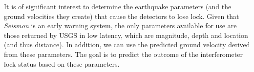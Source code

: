 \documentclass[reprint, prl, aps, showpacs]{revtex4-1}
\begin{document}

It is of significant interest to determine the earthquake parameters (and the ground velocities they create) that cause the detectors to lose lock.
Given that \emph{Seismon} is an early warning system, the only parameters available for use are those returned by USGS in low latency, which are magnitude, depth and location (and thus distance). 
In addition, we can use the predicted ground velocity derived from these parameters.
The goal is to predict the outcome of the interferometer lock status based on these parameters.
\end{document}
